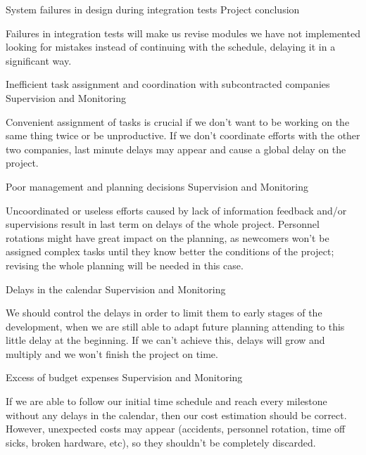 \begin{risk}[riskIntegrationTests]{System failures in design during integration tests}
\riskcat Project conclusion

Failures in integration tests will make us revise modules we have not implemented looking for mistakes instead of continuing with the schedule, delaying it in a significant way.
\end{risk}

\begin{risk}[riskAssignment]{Inefficient task assignment and coordination with subcontracted companies}
\riskcat Supervision and Monitoring

Convenient assignment of tasks is crucial if we don't want to be working on the same thing twice or be unproductive. If we don't coordinate efforts with the other two companies, last minute delays may appear and cause a global delay on the project.
\end{risk}

\begin{risk}[riskManagement]{Poor management and planning decisions}
\riskcat Supervision and Monitoring

Uncoordinated or useless efforts caused by lack of information feedback and/or supervisions result in last term on delays of the whole project. Personnel rotations might have great impact on the planning, as newcomers won't be assigned complex tasks until they know better the conditions of the project; revising the whole planning will be needed in this case.
\end{risk}

\begin{risk}[riskDelays]{Delays in the calendar}
\riskcat Supervision and Monitoring

We should control the delays in order to limit them to early stages of the development, when we are still able to adapt future planning attending to this little delay at the beginning. If we can't achieve this, delays will grow and multiply and we won't finish the project on time.
\end{risk}

\begin{risk}[riskBudget]{Excess of budget expenses}
\riskcat Supervision and Monitoring

If we are able to follow our initial time schedule and reach every milestone without any delays in the calendar, then our cost estimation should be correct. However, unexpected costs may appear (accidents, personnel rotation, time off sicks, broken hardware, etc), so they shouldn't be completely discarded.
\end{risk}

